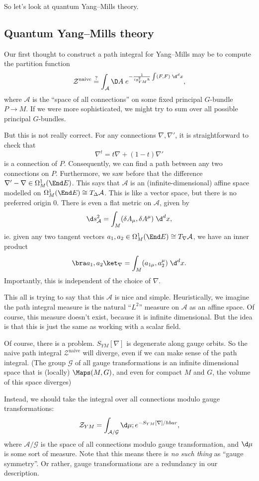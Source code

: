 \documentclass[a4paper]{article}
\begin{document}
So let's look at quantum Yang--Mills theory.
\subsection{Quantum Yang--Mills theory}
Our first thought to construct a path integral for Yang--Mills may be to compute the partition function
\[
  \mathcal{Z}^{\mathrm{naive}} \overset{?}{=} \int_\mathcal{A} \D A\; e^{-\frac{1}{i g_{YM}^2 \hbar} \int (F, F) \;\d^d x},
\]
where $\mathcal{A}$ is the ``space of all connections'' on some fixed principal $G$-bundle $P \to M$. If we were more sophisticated, we might try to sum over all possible principal $G$-bundles.

But this is not really correct. For any connections $\nabla, \nabla'$, it is straightforward to check that
\[
  \nabla^t = t \nabla + (1 - t) \nabla'
\]
is a connection of $P$. Consequently, we can find a path between any two connections on $P$. Furthermore, we saw before that the difference $\nabla' - \nabla \in \Omega_M^1 (\End E)$. This says that $\mathcal{A}$ is an (infinite-dimensional) affine space modelled on $\Omega^1_M(\End E) \cong T_\Delta \mathcal{A}$. This is like a vector space, but there is no preferred origin $0$. There is even a flat metric on $\mathcal{A}$, given by
\[
  \d s^2 _\mathcal{A} = \int_M (\delta A_\mu, \delta A^\mu)\;\d^d x,
\]
ie. given any two tangent vectors $a_1, a_2 \in \Omega_M^1(\End E) \cong T_\nabla \mathcal{A}$, we have an inner product
\[
  \bra a_1, a_2 \ket_\nabla = \int_M (a_{1 \mu}, a^{\mu}_2) \;\d^d x.
\]
Importantly, this is independent of the choice of $\nabla$.

This all is trying to say that this $\mathcal{A}$ is nice and simple. Heuristically, we imagine the path integral measure is the natural ``$L^2$'' measure on $\mathcal{A}$ as an affine space. Of course, this measure doesn't exist, because it is infinite dimensional. But the idea is that this is just the same as working with a scalar field.

Of course, there is a problem. $S_{YM}[\nabla]$ is degenerate along gauge orbits. So the naive path integral $\mathcal{Z}^{\mathrm{naive}}$ will diverge, even if we can make sense of the path integral. (The group $\mathcal{G}$ of all gauge transformations is an infinite dimensional space that is (locally) $\Maps(M, G)$, and even for compact $M$ and $G$, the volume of this space diverges)

Instead, we should take the integral over all connections modulo gauge transformations:
\[
  \mathcal{Z}_{YM} = \int_{\mathcal{A}/\mathcal{G}} \d \mu; e^{-S_{YM}[\nabla]/hbar},
\]
where $\mathcal{A}/\mathcal{G}$ is the space of all connections modulo gauge transformation, and $\d \mu$ is some sort of measure. Note that this means there is \emph{no such thing} as ``gauge symmetry''. Or rather, gauge transformations are a redundancy in our description.
\end{document}
